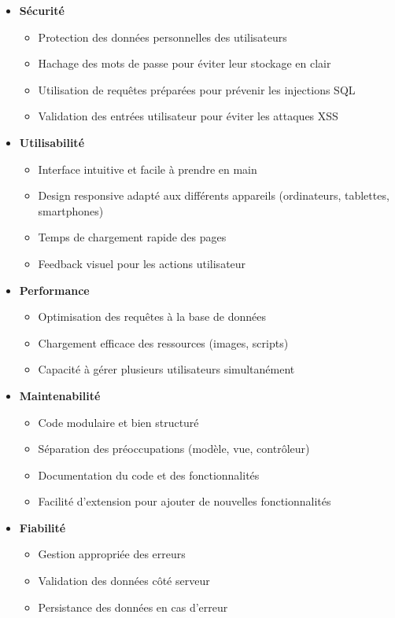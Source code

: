 \documentclass[a4paper,12pt]{article}
\begin{document}
\begin{itemize}
  \item \textbf{Sécurité}
  \begin{itemize}
    \item Protection des données personnelles des utilisateurs
    \item Hachage des mots de passe pour éviter leur stockage en clair
    \item Utilisation de requêtes préparées pour prévenir les injections SQL
    \item Validation des entrées utilisateur pour éviter les attaques XSS
  \end{itemize}

  \item \textbf{Utilisabilité}
  \begin{itemize}
    \item Interface intuitive et facile à prendre en main
    \item Design responsive adapté aux différents appareils (ordinateurs, tablettes, smartphones)
    \item Temps de chargement rapide des pages
    \item Feedback visuel pour les actions utilisateur
  \end{itemize}

  \item \textbf{Performance}
  \begin{itemize}
    \item Optimisation des requêtes à la base de données
    \item Chargement efficace des ressources (images, scripts)
    \item Capacité à gérer plusieurs utilisateurs simultanément
  \end{itemize}

  \item \textbf{Maintenabilité}
  \begin{itemize}
    \item Code modulaire et bien structuré
    \item Séparation des préoccupations (modèle, vue, contrôleur)
    \item Documentation du code et des fonctionnalités
    \item Facilité d'extension pour ajouter de nouvelles fonctionnalités
  \end{itemize}

  \item \textbf{Fiabilité}
  \begin{itemize}
    \item Gestion appropriée des erreurs
    \item Validation des données côté serveur
    \item Persistance des données en cas d'erreur
  \end{itemize}
\end{itemize}
\end{document}
